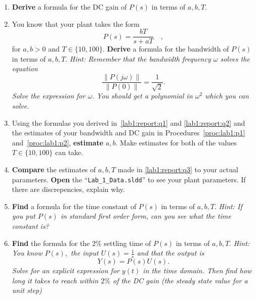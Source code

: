 \begin{deliverable}[label={lab1:report}]
  \begin{enumerate}[label={(\arabic*)}]
    \item{
      \label{lab1:report:q1}
      \textbf{Derive} a formula for the DC gain of \(P(s)\) in terms of
      \(a, b, T.\)
    }
    \item{
      \label{lab1:report:q2}
      You know that your plant takes the form
      \[
        P(s) = \frac{b T}{s + a T}\quad ,
      \]
      for \(a, b > 0\) and \(T \in \{10, 100\}.\) \textbf{Derive} a
      formula for the bandwidth of \(P(s)\) in terms of \(a, b, T.\)
      \emph{Hint: Remember that the bandwidth frequency \(\omega\) solves
      the equation}
      \[
        \frac{\left\|P(j \omega)\right\|}{\left\|P(0)\right\|}
        =
        \frac{1}{\sqrt{2}}.
      \]
      \emph{Solve the expression for \(\omega.\) You should get a polynomial in \(\omega^2\) which
      you can solve.}
    }
    \item{
      \label{lab1:report:q3}
      Using the formulas you derived in~\ref{lab1:report:q1} and
      \ref{lab1:report:q2} and the estimates of your bandwidth and DC gain
      in Procedures~\ref{proc:lab1:p1} and~\ref{proc:lab1:p2},
      \textbf{estimate} \(a, b.\)
      Make estimates for both of the values \(T\in \{10, 100\}\) can take.
    }
    \item{
      \label{lab1:report:q4}
      \textbf{Compare} the estimates of \(a, b, T\) made in
      \ref{lab1:report:q3} to your actual parameters.
      \textbf{Open} the ``\texttt{Lab\_1\_Data.sldd}'' to see your plant
      parameters. If there are discrepencies, explain why.
    }
    \item{
      \label{lab1:report:q5}
      \textbf{Find} a formula for the time constant of \(P(s)\) in terms of
      \(a, b, T.\) \emph{Hint: If you put \(P(s)\) in standard first order
      form, can you see what the time constant is?}
    }
    \item{
      \label{lab1:report:q6}
      \textbf{Find} the formula for the \(2\%\) settling time of \(P(s)\) in terms of \(a, b, T.\)
      \emph{Hint: You know \(P(s),\) the input \(U(s) = \frac{1}{s}\) and that
      the output is}
      \[
        Y(s) = P(s) U(s).
      \]
      \emph{Solve for an explicit expression for \(y(t)\) in the time domain.
      Then find how long it takes to reach within \(2\%\) of the DC gain (the steady state value for a unit step)}
}
\end{enumerate}
\end{deliverable}
